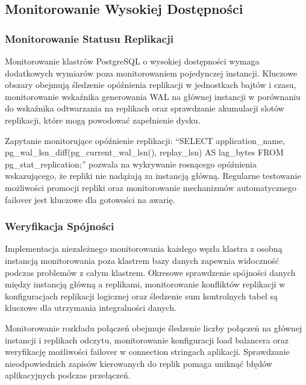 \documentclass[a4paper,11pt,openany,english]{sphinxmanual}
\begin{document}
\subsection{Monitorowanie Wysokiej Dostępności}
\label{\detokenize{rozdzial2/Monitorowanie-i-diagnostyka/index:monitorowanie-wysokiej-dostepnosci}}

\subsubsection{Monitorowanie Statusu Replikacji}
\label{\detokenize{rozdzial2/Monitorowanie-i-diagnostyka/index:monitorowanie-statusu-replikacji}}
\sphinxAtStartPar
Monitorowanie klastrów PostgreSQL o wysokiej dostępności wymaga dodatkowych wymiarów poza monitorowaniem pojedynczej instancji. Kluczowe obszary obejmują śledzenie opóźnienia replikacji w jednostkach bajtów i czasu, monitorowanie wskaźnika generowania WAL na głównej instancji w porównaniu do wskaźnika odtwarzania na replikach oraz sprawdzanie akumulacji slotów replikacji, które mogą powodować zapełnienie dysku.

\sphinxAtStartPar
Zapytanie monitorujące opóźnienie replikacji: “SELECT application\_name, pg\_wal\_lsn\_diff(pg\_current\_wal\_lsn(), replay\_lsn) AS lag\_bytes FROM pg\_stat\_replication;” pozwala na wykrywanie rosnącego opóźnienia wskazującego, że repliki nie nadążają za instancją główną. Regularne testowanie możliwości promocji repliki oraz monitorowanie mechanizmów automatycznego failover jest kluczowe dla gotowości na awarię.


\subsubsection{Weryfikacja Spójności}
\label{\detokenize{rozdzial2/Monitorowanie-i-diagnostyka/index:weryfikacja-spojnosci}}
\sphinxAtStartPar
Implementacja niezależnego monitorowania każdego węzła klastra z osobną instancją monitorowania poza klastrem bazy danych zapewnia widoczność podczas problemów z całym klastrem. Okresowe sprawdzenie spójności danych między instancją główną a replikami, monitorowanie konfliktów replikacji w konfiguracjach replikacji logicznej oraz śledzenie sum kontrolnych tabel są kluczowe dla utrzymania integralności danych.

\sphinxAtStartPar
Monitorowanie rozkładu połączeń obejmuje śledzenie liczby połączeń na głównej instancji i replikach odczytu, monitorowanie konfiguracji load balancera oraz weryfikację możliwości failover w connection stringach aplikacji. Sprawdzanie nieodpowiednich zapisów kierowanych do replik pomaga uniknąć błędów aplikacyjnych podczas przełączeń.
\end{document}
